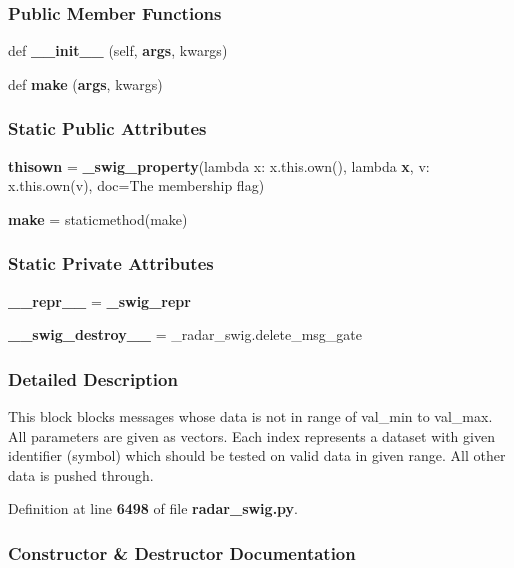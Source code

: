 \subsubsection*{Public Member Functions}
\begin{DoxyCompactItemize}
\item 
def {\bf \+\_\+\+\_\+init\+\_\+\+\_\+} (self, {\bf args}, kwargs)
\item 
def {\bf make} ({\bf args}, kwargs)
\end{DoxyCompactItemize}
\subsubsection*{Static Public Attributes}
\begin{DoxyCompactItemize}
\item 
{\bf thisown} = {\bf \+\_\+swig\+\_\+property}(lambda x\+: x.\+this.\+own(), lambda {\bf x}, v\+: x.\+this.\+own(v), doc=\textquotesingle{}The membership flag\textquotesingle{})
\item 
{\bf make} = staticmethod(make)
\end{DoxyCompactItemize}
\subsubsection*{Static Private Attributes}
\begin{DoxyCompactItemize}
\item 
{\bf \+\_\+\+\_\+repr\+\_\+\+\_\+} = {\bf \+\_\+swig\+\_\+repr}
\item 
{\bf \+\_\+\+\_\+swig\+\_\+destroy\+\_\+\+\_\+} = \+\_\+radar\+\_\+swig.\+delete\+\_\+msg\+\_\+gate
\end{DoxyCompactItemize}


\subsubsection{Detailed Description}
\begin{DoxyVerb}This block blocks messages whose data is not in range of val_min to val_max. All parameters are given as vectors. Each index represents a dataset with given identifier (symbol) which should be tested on valid data in given range. All other data is pushed through.\end{DoxyVerb}
 

Definition at line {\bf 6498} of file {\bf radar\+\_\+swig.\+py}.



\subsubsection{Constructor \& Destructor Documentation}
